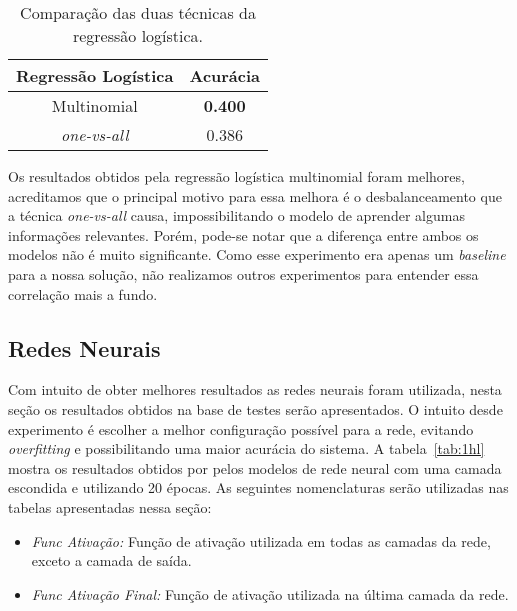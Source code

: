 \documentclass[conference]{IEEEtran}
\begin{document}
\begin{table}[h!]
	\centering
	
	\begin{tabular}{cc} \toprule
		\textbf{Regressão Logística} & \textbf{Acurácia} \\ \toprule 	
		Multinomial		          & \textbf{0.400}    \\
		\emph{one-vs-all}         & 0.386             \\ \bottomrule
	\end{tabular}
	\caption{Comparação das duas técnicas da regressão logística.}
	\label{tab:reg}
\end{table}

Os resultados obtidos pela regressão logística multinomial foram melhores, acreditamos que o principal motivo para essa melhora é o desbalanceamento que a técnica \emph{one-vs-all} causa, impossibilitando o modelo de aprender algumas informações relevantes. Porém, pode-se notar que a diferença entre ambos os modelos não é muito significante. Como esse experimento era apenas um \emph{baseline} para a nossa solução, não realizamos outros experimentos para entender essa correlação mais a fundo.

\subsection{Redes Neurais}

Com intuito de obter melhores resultados as redes neurais foram utilizada, nesta seção os resultados obtidos na base de testes serão apresentados. O intuito desde experimento é escolher a melhor configuração possível para a rede, evitando \emph{overfitting} e possibilitando uma maior acurácia do sistema. A tabela~\ref{tab:1hl} mostra os resultados obtidos por pelos modelos de rede neural com uma camada escondida e utilizando 20 épocas. As seguintes nomenclaturas serão utilizadas nas tabelas apresentadas nessa seção:

\begin{itemize}
	\item \emph{Func Ativação:} Função de ativação utilizada em todas as camadas da rede, exceto a camada de saída.
	
	\item \emph{Func Ativação Final:} Função de ativação utilizada na última camada da rede.
\end{itemize}
\end{document}
